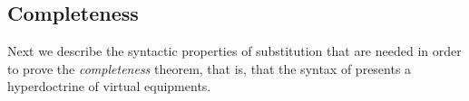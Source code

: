\documentclass{llncs}
\begin{document}

\subsection{Completeness}

Next we describe the syntactic properties of substitution that are
needed in order to prove the \emph{completeness} theorem, that is,
that the syntax of \vett{} presents a hyperdoctrine of virtual
equipments.
\end{document}
